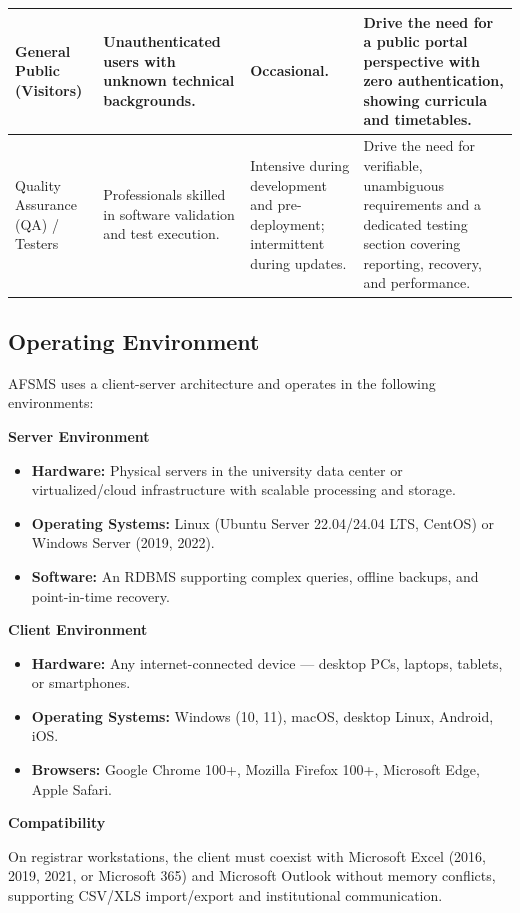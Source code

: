 \documentclass[11pt, a4paper]{article}
\renewcommand{\arraystretch}{1.3} %
\begin{document}
\begin{table}[H]
\begin{tabularx}{\textwidth}{>{\raggedright\arraybackslash}p{2.2cm} >{\raggedright\arraybackslash}X >{\raggedright\arraybackslash}X >{\raggedright\arraybackslash}X}
\midrule
General Public (Visitors) & Unauthenticated users with unknown technical backgrounds. & Occasional. & Drive the need for a public portal perspective with zero authentication, showing curricula and timetables. \\
\midrule
Quality Assurance (QA) / Testers & Professionals skilled in software validation and test execution. & Intensive during development and pre-deployment; intermittent during updates. & Drive the need for verifiable, unambiguous requirements and a dedicated testing section covering reporting, recovery, and performance. \\
\bottomrule
\end{tabularx}
\normalsize
\setlength{\arraystretch}{1.3}
\end{table}

\subsection{Operating Environment}
AFSMS uses a client-server architecture and operates in the following environments:

\textbf{Server Environment}
\begin{itemize}
    \item \textbf{Hardware:} Physical servers in the university data center or virtualized/cloud infrastructure with scalable processing and storage.
    \item \textbf{Operating Systems:} Linux (Ubuntu Server 22.04/24.04 LTS, CentOS) or Windows Server (2019, 2022).
    \item \textbf{Software:} An RDBMS supporting complex queries, offline backups, and point-in-time recovery.
\end{itemize}

\textbf{Client Environment}
\begin{itemize}
    \item \textbf{Hardware:} Any internet-connected device --- desktop PCs, laptops, tablets, or smartphones.
    \item \textbf{Operating Systems:} Windows (10, 11), macOS, desktop Linux, Android, iOS.
    \item \textbf{Browsers:} Google Chrome 100+, Mozilla Firefox 100+, Microsoft Edge, Apple Safari.
\end{itemize}

\textbf{Compatibility}

On registrar workstations, the client must coexist with Microsoft Excel (2016, 2019, 2021, or Microsoft 365) and Microsoft Outlook without memory conflicts, supporting CSV/XLS import/export and institutional communication.
\end{document}
